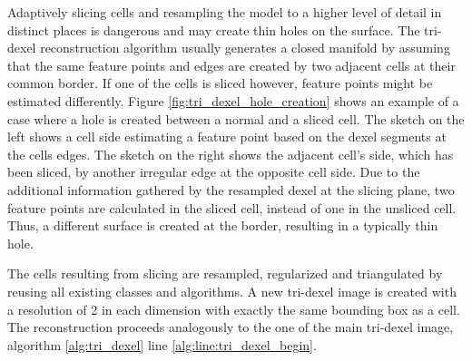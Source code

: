 Adaptively slicing cells and resampling the model to a higher level of detail in distinct places is dangerous and may create thin holes on the surface.
The tri-dexel reconstruction algorithm usually generates a closed manifold by assuming that the same feature points and edges are created by two adjacent cells at their common border.
If one of the cells is sliced however, feature points might be estimated differently.
Figure \ref{fig:tri_dexel_hole_creation} shows an example of a case where a hole is created between a normal and a sliced cell.
The sketch on the left shows a cell side estimating a feature point based on the dexel segments at the cells edges.
The sketch on the right shows the adjacent cell's side, which has been sliced, \eg by another irregular edge at the opposite cell side.
Due to the additional information gathered by the resampled dexel at the slicing plane, two feature points are calculated in the sliced cell, instead of one in the unsliced cell.
Thus, a different surface is created at the border, resulting in a typically thin hole.

The cells resulting from slicing are resampled, regularized and triangulated by reusing all existing classes and algorithms.
A new tri-dexel image is created with a resolution of 2 in each dimension with exactly the same bounding box as a cell.
The reconstruction proceeds analogously to the one of the main tri-dexel image, \cf algorithm \ref{alg:tri_dexel} line \ref{alg:line:tri_dexel_begin}. %

